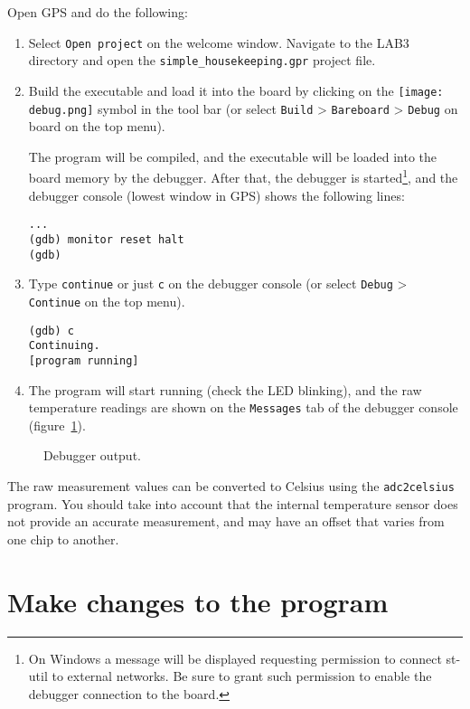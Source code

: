Open GPS and do the following:
\begin{enumerate}
\item Select {\tt Open project} on the welcome window. Navigate to the LAB3 directory and open the {\tt simple\_housekeeping.gpr} project file.
\item Build the executable and load it into the board by clicking on the \hbox{\texttt{[image: debug.png]}} symbol in the tool bar (or select {\tt Build} > {\tt Bareboard} > {\tt Debug} on board on the top menu).

The program will be compiled, and the executable will be loaded into the board memory by the debugger. After that, the debugger is started\footnote{On Windows a message will be displayed requesting permission to connect st-util to external networks. Be sure to grant such permission to enable the debugger connection to the board.}, and the debugger console (lowest window in GPS) shows the following lines:
\begin{verbatim}
...
(gdb) monitor reset halt
(gdb)
\end{verbatim}

\item Type {\tt continue} or just {\tt c} on the debugger console (or select {\tt Debug} > {\tt Continue} on the top menu).
\begin{verbatim}
(gdb) c
Continuing.
[program running]
\end{verbatim}

\item The program will start running (check the LED blinking), and the raw temperature readings are shown on the {\tt Messages} tab of the debugger console (figure~\ref{fig:gdb-output}).
\end{enumerate}

\begin{figure}[h]
            \caption{Debugger output.}
            \label{fig:gdb-output}
\end{figure}

The raw measurement values can be converted to Celsius using the {\tt adc2celsius} program. You should take into account that the internal temperature sensor does not provide an accurate measurement, and may have an offset that varies from one chip to another.

\section{Make changes to the program}


